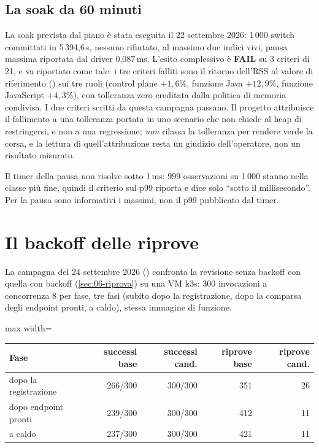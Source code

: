 \subsection{La soak da 60 minuti}

La soak prevista dal piano \`e stata eseguita il 22 settembre 2026: 1\,000 switch
committati in 5\,394{,}6\,s, nessuno rifiutato, al massimo due indici vivi, pausa
massima riportata dal driver 0{,}087\,ms. L'esito complessivo \`e \textbf{FAIL} su
3 criteri di 21, e va riportato come tale: i tre criteri falliti sono il ritorno
dell'RSS al valore di riferimento () sui tre ruoli
(control plane $+1{,}6\%$, funzione Java $+12{,}9\%$, funzione JavaScript
$+4{,}3\%$), con tolleranza zero ereditata dalla politica di memoria condivisa.
I due criteri scritti da questa campagna passano. Il progetto attribuisce il
fallimento a una tolleranza portata in uno scenario che non chiede al heap di
restringersi, e non a una regressione; \emph{non} rilassa la tolleranza per
rendere verde la corsa, e la lettura di quell'attribuzione resta un giudizio
dell'operatore, non un risultato misurato.

\begin{damisurare}
Il timer della pausa non risolve sotto 1\,ms: 999 osservazioni su 1\,000 stanno
nella classe pi\`u fine, quindi il criterio sul p99 riporta
 e dice solo ``sotto il millisecondo''. Per la pausa sono
informativi i massimi, non il p99 pubblicato dal timer.
\end{damisurare}

\section{Il backoff delle riprove}
\label{sec:25-backoff}

La campagna del 24 settembre 2026 ()
confronta la revisione senza backoff con quella con backoff
(\cref{sec:06-riprova}) su una VM k3s: 300 invocazioni a concorrenza 8 per fase,
tre fasi (subito dopo la registrazione, dopo la comparsa degli endpoint pronti,
a caldo), stessa immagine di funzione.

\begin{center}
\small
\begin{adjustbox}{max width=\textwidth}
\begin{tabular}{@{}lrrrr@{}}
\toprule
\textbf{Fase} & \textbf{successi base} & \textbf{successi cand.} &
\textbf{riprove base} & \textbf{riprove cand.} \\
\midrule
dopo la registrazione & 266/300 & 300/300 & 351 & 26 \\
dopo endpoint pronti & 239/300 & 300/300 & 412 & 11 \\
a caldo & 237/300 & 300/300 & 421 & 11 \\
\bottomrule
\end{tabular}
\end{adjustbox}
\end{center}

